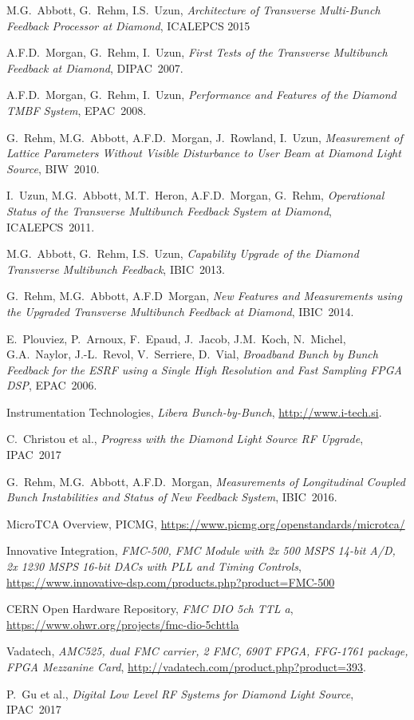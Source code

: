 \documentclass[
    a4paper,
    keeplastbox,            %
    hyphens,                %
    nospread,               %
]{jacow}
\begin{document}
\begin{thebibliography}{99}

M.G.~Abbott, G.~Rehm, I.S.~Uzun,
\emph{Architecture of Transverse Multi-Bunch Feedback Processor at Diamond},
ICALEPCS 2015

A.F.D.~Morgan, G.~Rehm, I.~Uzun, \emph{First Tests of the Transverse Multibunch
Feedback at Diamond}, DIPAC~2007.

A.F.D.~Morgan, G.~Rehm, I.~Uzun, \emph{Performance and Features of the Diamond
TMBF System}, EPAC~2008.

G.~Rehm, M.G.~Abbott, A.F.D.~Morgan, J.~Rowland, I.~Uzun, \emph{Measurement of
Lattice Parameters Without Visible Disturbance to User Beam at Diamond Light
Source}, BIW~2010.

I.~Uzun, M.G.~Abbott, M.T.~Heron, A.F.D.~Morgan, G.~Rehm, \emph{Operational
Status of the Transverse Multibunch Feedback System at Diamond}, ICALEPCS~2011.

M.G.~Abbott, G.~Rehm, I.S.~Uzun, \emph{Capability Upgrade of the Diamond
Transverse Multibunch Feedback}, IBIC~2013.

G.~Rehm, M.G.~Abbott, A.F.D~Morgan, \emph{New Features and Measurements using
the Upgraded Transverse Multibunch Feedback at Diamond}, IBIC~2014.

E.~Plouviez, P.~Arnoux, F.~Epaud, J.~Jacob, J.M.~Koch, N.~Michel, G.A.~Naylor,
J.\mbox{-}L.~Revol, V.~Serriere, D.~Vial, \emph{Broadband Bunch by Bunch
Feedback for the ESRF using a Single High Resolution and Fast Sampling FPGA
DSP}, EPAC~2006.

Instrumentation Technologies, \emph{Libera Bunch-by-Bunch},
\url{http://www.i-tech.si}.

C.~Christou et al., \emph{Progress with the Diamond Light Source RF Upgrade},
IPAC~2017

G.~Rehm, M.G.~Abbott, A.F.D.~Morgan, \emph{Measurements of Longitudinal Coupled
Bunch Instabilities and Status of New Feedback System}, IBIC~2016.

MicroTCA Overview, PICMG, \url{https://www.picmg.org/openstandards/microtca/}

Innovative Integration, \emph{FMC-500, FMC Module with 2x 500 MSPS 14-bit A/D,
2x 1230 MSPS 16-bit DACs with PLL and Timing Controls},
\url{https://www.innovative-dsp.com/products.php?product=FMC-500}

CERN Open Hardware Repository, \emph{FMC DIO 5ch TTL a},
\url{https://www.ohwr.org/projects/fmc-dio-5chttla}

Vadatech, \emph{AMC525, dual FMC carrier, 2 FMC, 690T FPGA, FFG-1761 package,
FPGA Mezzanine Card}, \url{http://vadatech.com/product.php?product=393}.

P.~Gu et al., \emph{Digital Low Level RF Systems for Diamond Light Source},
IPAC~2017


\end{thebibliography}
\end{document}
